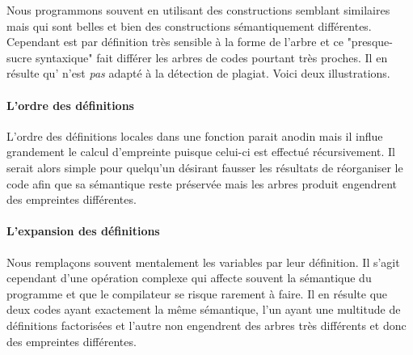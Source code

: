 
Nous programmons souvent en utilisant des constructions semblant
similaires mais qui sont belles et bien des constructions sémantiquement
différentes. Cependant {\Asak} est par définition très sensible à la
forme de l'arbre {\LambdaCode} et ce "presque-sucre syntaxique" fait
différer les arbres de codes pourtant très proches. Il en résulte
qu'{\Asak} n'est \emph{pas} adapté à la détection de plagiat. Voici deux illustrations.

\paragraph{L'ordre des définitions}

L'ordre des définitions locales dans une fonction parait anodin mais il influe grandement le calcul d'empreinte puisque celui-ci est effectué récursivement. Il serait alors simple pour quelqu'un désirant fausser les résultats de réorganiser le code afin que sa sémantique reste préservée mais les arbres {\LambdaCode} produit engendrent des empreintes différentes.

\paragraph{L'expansion des définitions}

Nous remplaçons souvent mentalement les variables par leur
définition. Il s'agit cependant d'une opération complexe qui affecte
souvent la sémantique du programme et que le compilateur se risque
rarement à faire. Il en résulte que deux codes ayant exactement la
même sémantique, l'un ayant une multitude de définitions factorisées
et l'autre non engendrent des arbres très différents et donc des empreintes différentes.
